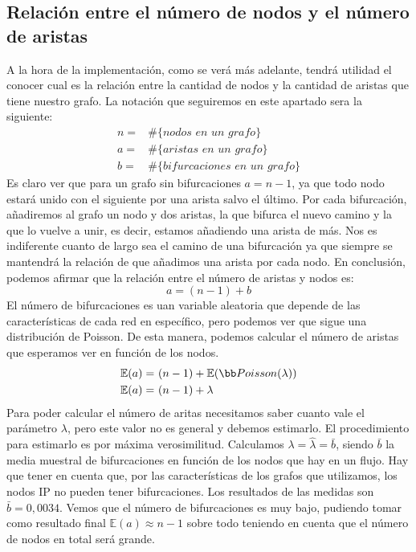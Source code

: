 \documentclass[twoside, 12pt]{epstfg}
\begin{document}
\subsection{Relación entre el número de nodos y el número de aristas}
A la hora de la implementación, como se verá más adelante, tendrá utilidad el conocer cual es la relación entre la cantidad de nodos y la cantidad de aristas que tiene nuestro grafo. La notación que seguiremos en este apartado sera la siguiente:
\begin{align*}
	n =& \mathbin{\#}\{\textit{nodos en un grafo}\} \\
	a =& \mathbin{\#}\{\textit{aristas en un grafo}\} \\
	b =& \mathbin{\#}\{\textit{bifurcaciones en un grafo}\}
\end{align*}
Es claro ver que para un grafo sin bifurcaciones \(a = n-1\), ya que todo nodo estará unido con el siguiente por una arista salvo el último. Por cada bifurcación, añadiremos al grafo un nodo y dos aristas, la que bifurca el nuevo camino y la que lo vuelve a unir, es decir, estamos añadiendo una arista de más. Nos es indiferente cuanto de largo sea el camino de una bifurcación ya que siempre se mantendrá la relación de que añadimos una arista por cada nodo. En conclusión, podemos afirmar que la relación entre el número de aristas y nodos es:
\begin{equation*}
    a = (n - 1) + b
\end{equation*}
El número de bifurcaciones es uan variable aleatoria que depende de las características de cada red en específico, pero podemos ver que sigue una distribución de Poisson. De esta manera, podemos calcular el número de aristas que esperamos ver en función de los nodos. 
\begin{align*}
 \mathbb{E}(a) =&\ (n - 1) + \mathbb{E}(\bb Poisson(\lambda))\\
 \mathbb{E}(a) =&\ (n - 1) + \lambda
\end{align*}
Para poder calcular el número de aritas necesitamos saber cuanto vale el parámetro $\lambda$, pero este valor no es general y debemos estimarlo. El procedimiento para estimarlo es por máxima verosimilitud. Calculamos $\lambda = \widehat{\lambda} = \bar{b}$, siendo $\bar{b}$ la media muestral de bifurcaciones en función de los nodos que hay en un flujo. Hay que tener en cuenta que, por las características de los grafos que utilizamos, los nodos IP no pueden tener bifurcaciones. Los resultados de las medidas son $\bar{b} = 0,0034$. Vemos que el número de bifurcaciones es muy bajo, pudiendo tomar como resultado final $\mathbb{E}(a) \approx n - 1$ sobre todo teniendo en cuenta que el número de nodos en total será grande.
\end{document}
